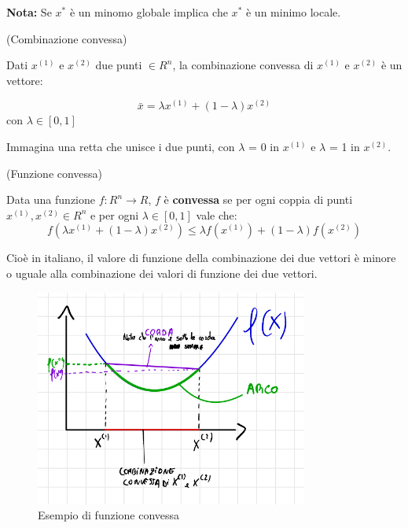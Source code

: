 \textbf{Nota:} Se $x^*$ è un minomo globale implica che $x^*$ è un minimo locale.

\begin{definition}
    (Combinazione convessa)

    Dati $x^{(1)}$ e $x^{(2)}$ due punti $\in R^n$, la combinazione convessa di
    $x^{(1)}$ e $x^{(2)}$ è un vettore:

    $$
        \bar{x} = \lambda x^{(1)} + (1 - \lambda) x^{(2)}$$
    con $\lambda \in [0,1]$

    Immagina una retta che unisce i due punti, con $\lambda$ = 0 in $x^{(1)}$ e
    $\lambda$ = 1 in $x^{(2)}$.
\end{definition}

\begin{definition}
    (Funzione convessa)

    Data una funzione $f: R^n \rightarrow R$, $f$ è \textbf{convessa} se per ogni
    coppia di punti $x^{(1)}, x^{(2)} \in R^n$ e per ogni $\lambda \in [0,1]$ vale
    che: $$ f(\lambda x^{(1)} + (1 - \lambda) x^{(2)}) \leq \lambda f(x^{(1)}) + (1
        - \lambda) f(x^{(2)}) $$

    Cioè in italiano, il valore di funzione della combinazione dei due vettori è
    minore o uguale alla combinazione dei valori di funzione dei due vettori.

    \begin{figure}[H]
        \centering
        \includegraphics[width=0.8\textwidth]{images/funz conv.png}
        \caption{Esempio di funzione convessa}
        \label{fig:esempio-di-funzione-convessa}
    \end{figure}


\end{definition}
